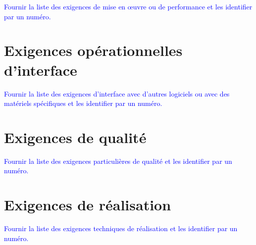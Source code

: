 \documentclass[a4paper,11pt,french]{article}
\begin{document}
\textcolor{blue}{
  Fournir la liste des exigences de mise en œuvre ou de performance et les identifier par un numéro.
}

\section{Exigences opérationnelles d'interface}

\textcolor{blue}{
  Fournir la liste des exigences d’interface avec d’autres logiciels ou avec des matériels 
  spécifiques et les identifier par un numéro.
}

\section{Exigences de qualité}

\textcolor{blue}{
  Fournir la liste des exigences particulières de qualité et les identifier par un numéro.
}

\section{Exigences de réalisation}

\textcolor{blue}{
  Fournir la liste des exigences techniques de réalisation et les identifier par un numéro.
}
\end{document}
